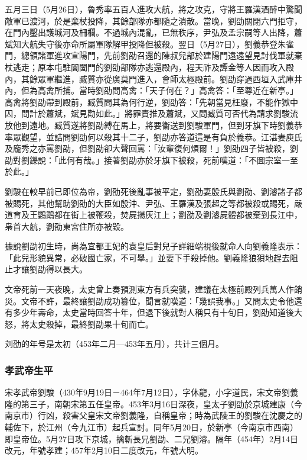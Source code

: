 五月三日（5月26日），魯秀率五百人進攻大航，將之攻克，守將王羅漢酒醉中驚聞敵軍已渡河，於是棄杖投降，其餘部隊亦都隨之潰散。當晚，劉劭關閉六門拒守，在門內鑿出護城河及柵欄。不過城內混亂，已無秩序，尹弘及孟宗嗣等人出降，蕭斌知大航失守後亦命所屬軍隊解甲投降但被殺。翌日（5月27日），劉義恭登朱雀門，總領諸軍進攻宣陽門，先前劉劭召還的陳叔兒部於建陽門遠遠望見討伐軍就棄杖逃走；原本屯駐閶闔門的劉劭部隊亦逃還殿內，程天祚及譚金等人因而攻入殿內，其餘眾軍繼進，臧質亦從廣莫門進入，會師太極殿前。劉劭穿過西垣入武庫井內，但為高禽所捕。當時劉劭問高禽：「天子何在？」高禽答：「至尊近在新亭。」高禽將劉劭帶到殿前，臧質問其為何行逆，劉劭答：「先朝當見枉廢，不能作獄中囚，問計於蕭斌，斌見勸如此。」將罪責推及蕭斌，又問臧質可否代為請求劉駿流放他到遠地。臧質遂將劉劭縛在馬上，將要衞送到劉駿軍門，但到牙旗下時劉義恭率眾觀望，並詰問劉劭何以殺其十二子，劉劭亦答道這是有負於義恭。江湛妻庾氏及龐秀之亦罵劉劭，但劉劭卻大聲回罵：「汝輩復何煩爾！」劉劭四子皆被殺，劉劭對劉鑠說：「此何有哉。」接著劉劭亦於牙旗下被殺，死前嘆道：「不圖宗室一至於此。」

劉駿在較早前已即位為帝，劉劭死後亂事被平定，劉劭妻殷氏與劉劭、劉濬諸子都被賜死，其他幫助劉劭的大臣如殷沖、尹弘、王羅漢及張超之等都被殺或賜死，嚴道育及王鸚鵡都在街上被鞭殺，焚屍揚灰江上；劉劭及劉濬屍體都被棄到長江中，枭首大航，劉劭東宮住所亦被毀。

據說劉劭初生時，尚為宜都王妃的袁皇后對兒子詳細端視後就命人向劉義隆表示：「此兒形貌異常，必破國亡家，不可舉。」並要下手殺掉他。劉義隆狼狽地趕去阻止才讓劉劭得以長大。

文帝死前一天夜晚，太史曾上奏預測東方有兵突襲，建議在太極前殿列兵萬人作銷災。文帝不許，最終讓劉劭成功篡位，聞言就嘆道：「幾誤我事。」又問太史令他還有多少年壽命，太史當時回答十年，但退下後就對人稱只有十旬日，劉劭知道後大怒，將太史殺掉，最終劉劭果十旬而亡。

刘劭的年号是太初（453年二月—453年五月），共计三個月。

\subsubsection{孝武帝生平}

宋孝武帝劉駿（430年9月19日－464年7月12日），字休龍，小字道民，宋文帝劉義隆的第三子，南朝宋第五任皇帝。453年3月16日深夜，皇太子劉劭於京城建康（今南京市）行凶，殺害父皇宋文帝劉義隆，自稱皇帝；時為武陵王的劉駿在沈慶之的輔佐下，於江州（今九江市）起兵宣討。同年5月20日，於新亭（今南京市西南）即皇帝位。5月27日攻下京城，擒斬長兄劉劭、二兄劉濬。隔年（454年）2月14日改元，年號孝建；457年2月10日二度改元，年號大明。

